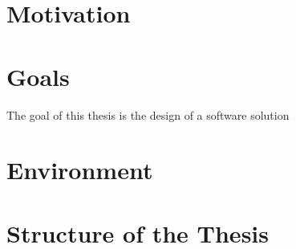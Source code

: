 

\section{Motivation}
\section{Goals}
The goal of this thesis is the design of a software solution 
\section{Environment}
\section{Structure of the Thesis}


